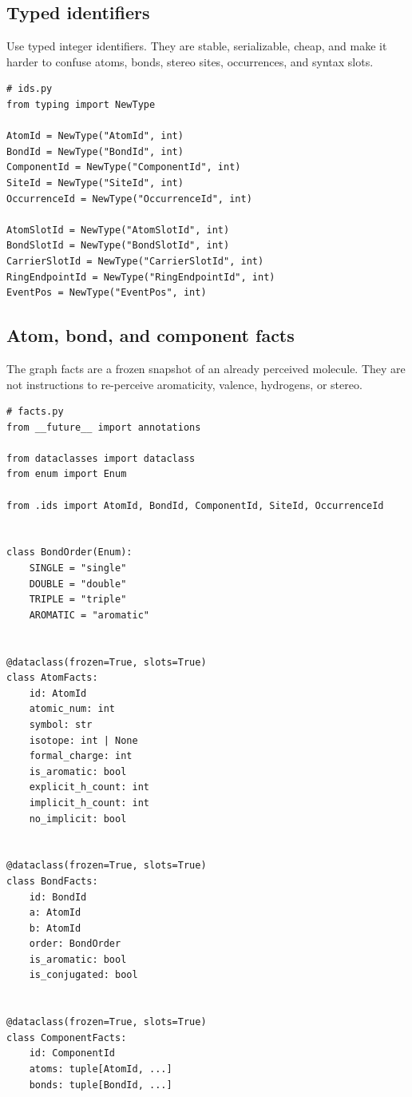 \documentclass[10pt,a4paper]{article}
\theoremstyle{definition}
\theoremstyle{remark}
\begin{document}
\subsection{Typed identifiers}

Use typed integer identifiers.  They are stable, serializable, cheap, and make
it harder to confuse atoms, bonds, stereo sites, occurrences, and syntax slots.

\begin{lstlisting}
# ids.py
from typing import NewType

AtomId = NewType("AtomId", int)
BondId = NewType("BondId", int)
ComponentId = NewType("ComponentId", int)
SiteId = NewType("SiteId", int)
OccurrenceId = NewType("OccurrenceId", int)

AtomSlotId = NewType("AtomSlotId", int)
BondSlotId = NewType("BondSlotId", int)
CarrierSlotId = NewType("CarrierSlotId", int)
RingEndpointId = NewType("RingEndpointId", int)
EventPos = NewType("EventPos", int)
\end{lstlisting}

\subsection{Atom, bond, and component facts}

The graph facts are a frozen snapshot of an already perceived molecule.  They
are not instructions to re-perceive aromaticity, valence, hydrogens, or stereo.

\begin{lstlisting}
# facts.py
from __future__ import annotations

from dataclasses import dataclass
from enum import Enum

from .ids import AtomId, BondId, ComponentId, SiteId, OccurrenceId


class BondOrder(Enum):
    SINGLE = "single"
    DOUBLE = "double"
    TRIPLE = "triple"
    AROMATIC = "aromatic"


@dataclass(frozen=True, slots=True)
class AtomFacts:
    id: AtomId
    atomic_num: int
    symbol: str
    isotope: int | None
    formal_charge: int
    is_aromatic: bool
    explicit_h_count: int
    implicit_h_count: int
    no_implicit: bool


@dataclass(frozen=True, slots=True)
class BondFacts:
    id: BondId
    a: AtomId
    b: AtomId
    order: BondOrder
    is_aromatic: bool
    is_conjugated: bool


@dataclass(frozen=True, slots=True)
class ComponentFacts:
    id: ComponentId
    atoms: tuple[AtomId, ...]
    bonds: tuple[BondId, ...]
\end{lstlisting}
\end{document}
